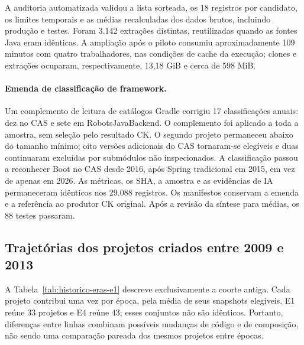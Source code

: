 A auditoria automatizada validou a lista sorteada, os 18 registros por candidato, os limites temporais e as médias recalculadas dos dados brutos, incluindo produção e testes. Foram 3.142 extrações distintas, reutilizadas quando as fontes Java eram idênticas. A ampliação após o piloto consumiu aproximadamente 109 minutos com quatro trabalhadores, nas condições de cache da execução; clones e extrações ocuparam, respectivamente, 13,18 GiB e cerca de 598 MiB.

\paragraph{Emenda de classificação de framework.}
Um complemento de leitura de catálogos Gradle corrigiu 17 classificações anuais: dez no CAS e sete em RobotsJavaBackend. O complemento foi aplicado a toda a amostra, sem seleção pelo resultado CK. O segundo projeto permaneceu abaixo do tamanho mínimo; oito versões adicionais do CAS tornaram-se elegíveis e duas continuaram excluídas por submódulos não inspecionados. A classificação passou a reconhecer Boot no CAS desde 2016, após Spring tradicional em 2015, em vez de apenas em 2026. As métricas, os SHA, a amostra e as evidências de IA permaneceram idênticos nos 29.088 registros. Os manifestos conservam a emenda e a referência ao produtor CK original. Após a revisão da síntese para médias, os 88 testes passaram.

\subsection{Trajetórias dos projetos criados entre 2009 e 2013}
\label{subsec:trajetorias-antigas}

A Tabela~\ref{tab:historico-eras-e1} descreve exclusivamente a coorte antiga. Cada projeto contribui uma vez por época, pela média de seus snapshots elegíveis. E1 reúne 33 projetos e E4 reúne 43; esses conjuntos não são idênticos. Portanto, diferenças entre linhas combinam possíveis mudanças de código e de composição, não sendo uma comparação pareada dos mesmos projetos entre épocas.

\begin{table}[htbp]
\centering\scriptsize
\caption{Coorte antiga: médias por época do código, com produção e testes.}
\label{tab:historico-eras-e1}
\end{table}


